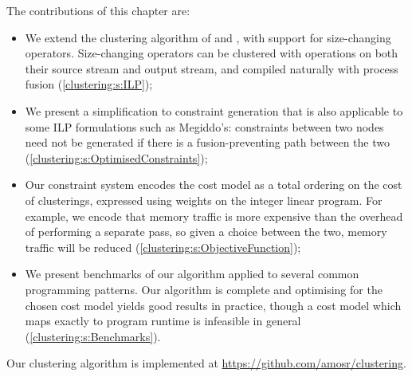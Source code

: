 The contributions of this chapter are:
\begin{itemize}
\item   
We extend the clustering algorithm of \citet{megiddo1998optimal} and \citet{darte2002contraction}, with support for size-changing operators.
Size-changing operators can be clustered with operations on both their source stream and output stream, and compiled naturally with process fusion (\cref{clustering:s:ILP});

\item
We present a simplification to constraint generation that is also applicable to some ILP formulations such as Megiddo's:
constraints between two nodes need not be generated if there is a fusion-preventing path between the two (\cref{clustering:s:OptimisedConstraints});

\item
Our constraint system encodes the cost model as a total ordering on the cost of clusterings, expressed using weights on the integer linear program.
For example, we encode that memory traffic is more expensive than the overhead of performing a separate pass, so given a choice between the two, memory traffic will be reduced (\cref{clustering:s:ObjectiveFunction});

\item
We present benchmarks of our algorithm applied to several common programming patterns.
Our algorithm is complete and optimising for the chosen cost model yields good results in practice, though a cost model which maps exactly to program runtime is infeasible in general (\cref{clustering:s:Benchmarks}).
\end{itemize}

Our clustering algorithm is implemented at \url{https://github.com/amosr/clustering}.












